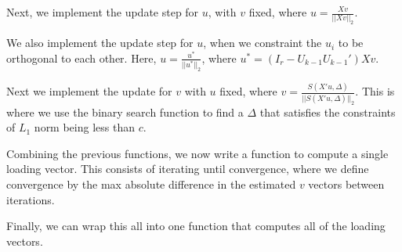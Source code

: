 \documentclass[11pt]{article}
\begin{document}
Next, we implement the update step for $u$, with $v$ fixed, where $u = \frac{Xv}{||Xv||_2}$. 


We also implement the update step for $u$, when we constraint the $u_i$ to be orthogonal to each other. Here, $u = \frac{u^{*}}{||u^{*}||_2}$, where $u^{*} = (I_r - U_{k - 1}U_{k - 1}')Xv$.


Next we implement the update for $v$ with $u$ fixed, where $v = \frac{S(X'u, \Delta)}{||S(X'u, \Delta)||_2}$. This is where we use the binary search function to find a $\Delta$ that satisfies the constraints of $L_1$ norm being less than $c$. 


Combining the previous functions, we now write a function to compute a single loading vector. This consists of iterating until convergence, where we define convergence by the max absolute difference in the estimated $v$ vectors between iterations. 


Finally, we can wrap this all into one function that computes all of the loading vectors.

\end{document}

